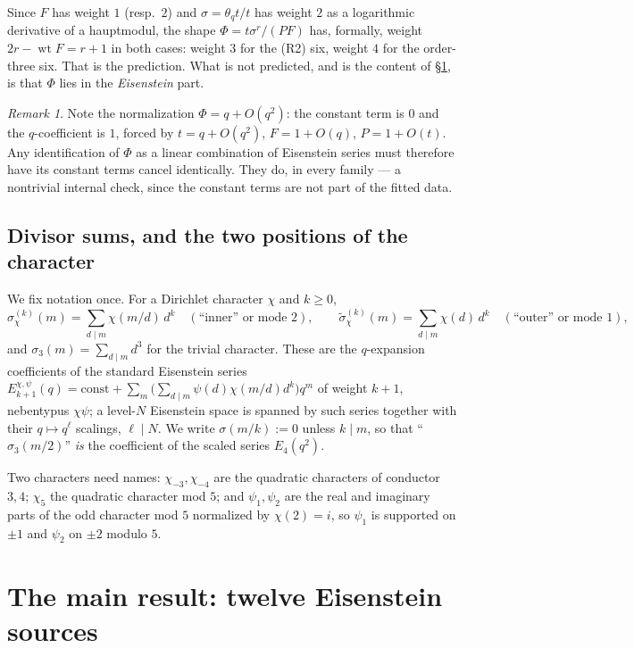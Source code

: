 \documentclass[11pt,reqno]{amsart}
\theoremstyle{plain}
\theoremstyle{definition}
\theoremstyle{remark}
\newtheorem{remark}[theorem]{Remark}
\newcommand{\thq}{\theta_q}
\newcommand{\chim}[1]{\chi_{-#1}}
\begin{document}
Since $F$ has weight $1$ (resp.\ $2$) and $\sigma=\thq t/t$ has weight $2$
as a logarithmic derivative of a hauptmodul, the shape
$\Phi=t\sigma^{r}/(PF)$ has, formally, weight $2r-\operatorname{wt}F=r+1$
in both cases: weight $3$ for the (R2) six, weight $4$ for the order-three
six. That is the prediction. What is not predicted, and is the content of
\S\ref{sec:sources}, is that $\Phi$ lies in the \emph{Eisenstein} part.

\begin{remark}
Note the normalization $\Phi=q+O(q^2)$: the constant term is $0$ and the
$q$-coefficient is $1$, forced by $t=q+O(q^2)$, $F=1+O(q)$, $P=1+O(t)$.
Any identification of $\Phi$ as a linear combination of Eisenstein series
must therefore have its constant terms cancel identically. They do, in every
family --- a nontrivial internal check, since the constant terms are not
part of the fitted data.
\end{remark}

\subsection{Divisor sums, and the two positions of the character}
We fix notation once. For a Dirichlet character $\chi$ and $k\ge0$,
\[
\sigma_\chi^{(k)}(m)=\sum_{d\mid m}\chi(m/d)\,d^{k}
\quad(\text{``inner'' or mode 2}),\qquad
\widetilde\sigma_\chi^{(k)}(m)=\sum_{d\mid m}\chi(d)\,d^{k}
\quad(\text{``outer'' or mode 1}),
\]
and $\sigma_3(m)=\sum_{d\mid m}d^3$ for the trivial character. These are
the $q$-expansion coefficients of the standard Eisenstein series
$E_{k+1}^{\chi,\psi}(q)=\text{const}+\sum_m\bigl(\sum_{d\mid
m}\psi(d)\chi(m/d)d^{k}\bigr)q^m$ of weight $k+1$, nebentypus $\chi\psi$; a
level-$N$ Eisenstein space is spanned by such series together with their
$q\mapsto q^{\ell}$ scalings, $\ell\mid N$. We write $\sigma(m/k):=0$ unless
$k\mid m$, so that ``$\sigma_3(m/2)$'' \emph{is} the coefficient of the
scaled series $E_4(q^2)$.

Two characters need names: $\chim3,\chim4$ are the quadratic characters of
conductor $3,4$; $\chi_5$ the quadratic character mod $5$; and
$\psi_1,\psi_2$ are the real and imaginary parts of the odd character mod
$5$ normalized by $\chi(2)=i$, so $\psi_1$ is supported on $\pm1$ and
$\psi_2$ on $\pm2$ modulo $5$.

\section{The main result: twelve Eisenstein sources}
\label{sec:sources}
\end{document}
